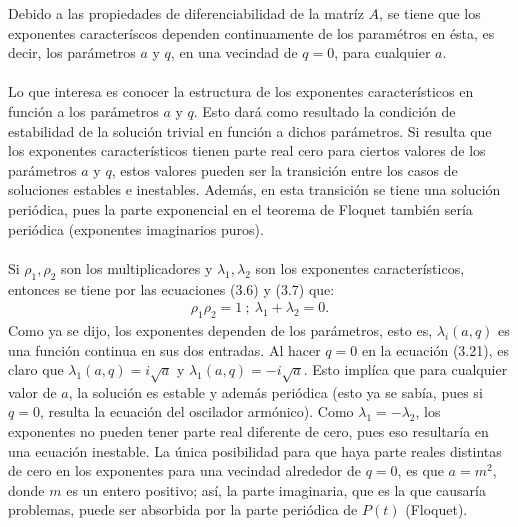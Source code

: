 Debido a las propiedades de diferenciabilidad de la matríz $A$, se tiene que los exponentes caracteríscos dependen continuamente de los paramétros en ésta, es decir, los parámetros $a$ y $q$, en una vecindad de $q=0$, para cualquier $a$.
\\
\\
Lo que interesa es conocer la estructura de los exponentes característicos en función a los parámetros $a$ y $q$. Esto dará como resultado la condición de estabilidad de la solución trivial en función a dichos parámetros. Si resulta que los exponentes característicos tienen parte real cero para ciertos valores de los parámetros $a$ y $q$, estos valores pueden ser la transición entre los casos de soluciones estables e inestables. Además, en esta transición se tiene una solución periódica, pues la parte exponencial en el teorema de Floquet también sería periódica (exponentes imaginarios puros). 
\\
\\
Si $\rho_{1}, \rho_{2}$ son los multiplicadores y $\lambda_{1},\lambda_{2}$ son los exponentes característicos, entonces se tiene por las ecuaciones (3.6) y (3.7) que:
\begin{eqnarray*}
\rho_{1}\rho_{2}=1 \ ; \ \lambda_{1}+\lambda_{2}=0.
\end{eqnarray*}
Como ya se dijo, los exponentes dependen de los parámetros, esto es, $\lambda_{i}(a,q)$ es una función continua en sus dos entradas. Al hacer $q=0$ en la ecuación (3.21), es claro que $\lambda_{1}(a,q)=i\sqrt{a}$ y $\lambda_{1}(a,q)=-i\sqrt{a}$. Esto implíca que para cualquier valor de $a$, la solución es estable y además periódica (esto ya se sabía, pues si $q=0$, resulta la ecuación del oscilador armónico). Como $\lambda_{1}=-\lambda_{2}$, los exponentes no pueden tener parte real diferente de cero, pues eso resultaría en una ecuación inestable. La única posibilidad para que haya parte reales distintas de cero en los exponentes para una vecindad alrededor de $q=0$, es que $a=m^2$, donde $m$ es un entero positivo; así, la parte imaginaria, que es la que causaría problemas, puede ser absorbida por la parte periódica de $P(t)$ (Floquet). 
